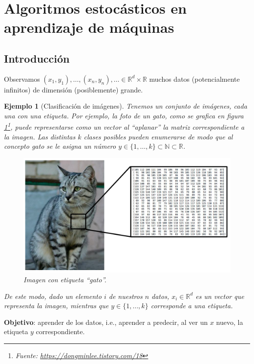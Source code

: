 \documentclass[letterpaper,11pt]{article} %
\theoremstyle{defbreak}
\newtheorem{example}{Ejemplo}[subsection]
\theoremstyle{propbreak}
\theoremstyle{remark}
\theoremstyle{break}
\def\R{\mathbb{R}}
\def\N{\mathbb{N}}
\def\samples{(x_1,y_1),\dots,(x_n,y_n),\dots}
\begin{document}
\newpage
\section{Algoritmos estocásticos en aprendizaje de máquinas}
\subsection{Introducción}
Observamos  $\samples\in\R^d\times\R$ muchos datos (potencialmente infinitos) de dimensión (posiblemente) grande.
\begin{example}[Clasificación de imágenes]
Tenemos un conjunto de imágenes, cada una con una etiqueta. Por ejemplo, la foto de un gato, como se grafica en figura \ref{fig:gato}\footnote{Fuente: \url{https://dongminlee.tistory.com/18}}, puede representarse como un vector al ``aplanar'' la matriz correspondiente a la imagen. Las distintas $k$ clases posibles pueden enumerarse de modo que al concepto \textit{gato} se le asigna un número $y\in\{1,\dots,k\}\subset\N\subset\R$.
\begin{figure}
    \centering
    \includegraphics[scale=0.32]{img/figura_gato.png}
    \caption{Imagen con etiqueta ``gato''.}
    \label{fig:gato}
\end{figure}
De este modo, dado un elemento $i$ de nuestros $n$ datos, $x_i\in\R^d$ es un vector que representa la imagen, mientras que $y\in\{1,\dots,k\}$ corresponde a una etiqueta.
\end{example}
\newp \textbf{Objetivo}: aprender de los datos, i.e., aprender a predecir, al ver un $x$ nuevo, la etiqueta $y$ correspondiente.
\end{document}
